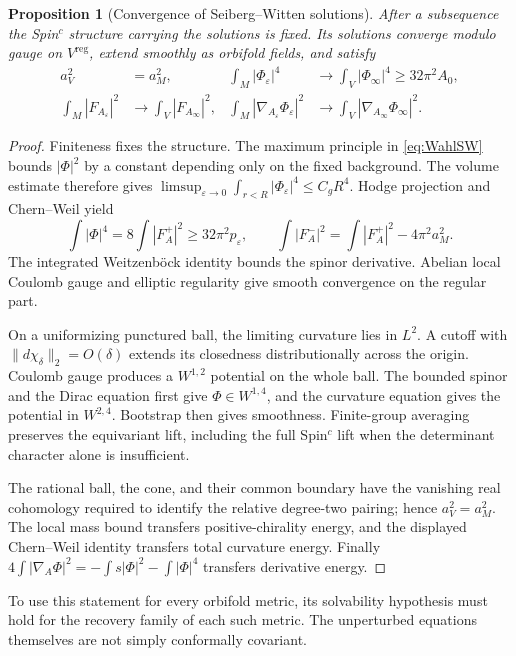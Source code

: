 \documentclass[11pt,a4paper]{article}
\newtheorem{proposition}[theorem]{Proposition}
\theoremstyle{definition}\newtheorem{definition}[theorem]{Definition}
\theoremstyle{remark}\newtheorem{remark}[theorem]{Remark}
\newcommand{\eps}{\varepsilon}
\newcommand{\norm}[1]{\lVert #1\rVert}
\begin{document}
\begin{proposition}[Convergence of Seiberg--Witten solutions]\label{prop:Wahlfield}
After a subsequence the Spin$^c$ structure carrying the solutions is fixed. Its solutions converge modulo gauge on $V^{\mathrm{reg}}$, extend smoothly as orbifold fields, and satisfy
\begin{align*}
 a_V^2&=a_M^2,&
 \int_M|\Phi_\eps|^4&\longrightarrow\int_V|\Phi_\infty|^4\ge32\pi^2A_0,\\
 \int_M|F_{A_\eps}|^2&\longrightarrow\int_V|F_{A_\infty}|^2,&
 \int_M|\nabla_{A_\eps}\Phi_\eps|^2&\longrightarrow\int_V|\nabla_{A_\infty}\Phi_\infty|^2.
\end{align*}
\end{proposition}
\begin{proof}
Finiteness fixes the structure. The maximum principle in \eqref{eq:WahlSW} bounds $|\Phi|^2$ by a constant depending only on the fixed background. The volume estimate therefore gives
$\limsup_{\eps\to0}\int_{r<R}|\Phi_\eps|^4\le C_gR^4$.
Hodge projection and Chern--Weil yield
\[
 \int|\Phi|^4=8\int|F_A^+|^2\ge32\pi^2p_\eps,
 \qquad\int|F_A^-|^2=\int|F_A^+|^2-4\pi^2a_M^2.
\]
The integrated Weitzenböck identity bounds the spinor derivative. Abelian local Coulomb gauge and elliptic regularity give smooth convergence on the regular part.

On a uniformizing punctured ball, the limiting curvature lies in $L^2$. A cutoff with $\norm{d\chi_\delta}_2=O(\delta)$ extends its closedness distributionally across the origin. Coulomb gauge produces a $W^{1,2}$ potential on the whole ball. The bounded spinor and the Dirac equation first give $\Phi\in W^{1,4}$, and the curvature equation gives the potential in $W^{2,4}$. Bootstrap then gives smoothness. Finite-group averaging preserves the equivariant lift, including the full Spin$^c$ lift when the determinant character alone is insufficient.

The rational ball, the cone, and their common boundary have the vanishing real cohomology required to identify the relative degree-two pairing; hence $a_V^2=a_M^2$. The local mass bound transfers positive-chirality energy, and the displayed Chern--Weil identity transfers total curvature energy. Finally
$4\int|\nabla_A\Phi|^2=-\int s|\Phi|^2-\int|\Phi|^4$
transfers derivative energy.
\end{proof}
To use this statement for every orbifold metric, its solvability hypothesis must hold for the recovery family of each such metric. The unperturbed equations themselves are not simply conformally covariant.
\end{document}
